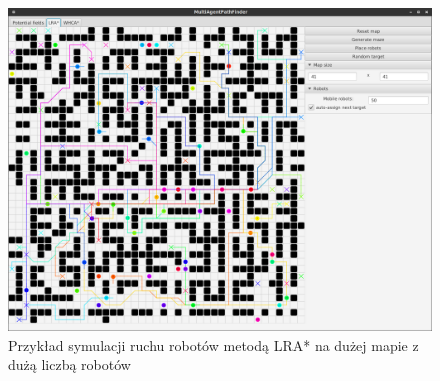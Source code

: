\begin{figure}
	\centering
	\includegraphics[width=0.8\columnwidth]{img/robopath/lra-bigmap}
	\caption{Przykład symulacji ruchu robotów metodą LRA* na dużej mapie z dużą liczbą robotów}
	\label{fig:test-lra-bigmap}
\end{figure}

